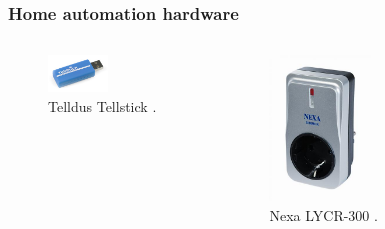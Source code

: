 \documentclass{beamer}
\begin{document}
\begin{frame}
\frametitle{Home automation hardware}

	\begin{columns}

	
		\begin{center}
			\begin{figure}
				\includegraphics[width=0.5\textwidth]{tellstick.jpg}
				\caption{Telldus Tellstick \cite{tellstick}.}
			\end{figure}
		\end{center}


		\begin{center}
			\begin{figure}
				\includegraphics[width=0.5\textwidth]{lycr-300.jpg}
				\caption{Nexa LYCR-300 \cite{lycr-300}.}
			\end{figure}
		\end{center}

	\end{columns}

\end{frame}
\end{document}
